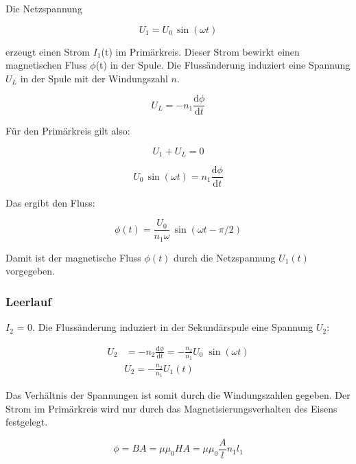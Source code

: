 \documentclass[11pt,ngerman]{scrartcl}
\newcommand{\der}[2]{\frac{\mathrm{d}#1}{\mathrm{d}#2}}
\begin{document}
Die Netzspannung

\begin{equation}
	U_1 = U_0 \, \sin{(\omega t)}
\end{equation}

erzeugt einen Strom $I_1$(t) im Primärkreis. Dieser Strom bewirkt einen magnetischen Fluss $\phi$(t)
in der Spule. Die Flussänderung induziert eine Spannung $U_L$ in der Spule mit der Windungszahl
$n$.

\begin{equation}
	U_L = -n_1 \der{\phi}{t}
\end{equation}

Für den Primärkreis gilt also:

\begin{equation}
	U_1 + U_L = 0
\end{equation}

\begin{equation}
	U_0 \, \sin{(\omega t)} = n_1 \der{\phi}{t}
	\label{eq:aleksey}
\end{equation}

Das ergibt den Fluss:

\begin{equation}
	\phi (t) = \frac{U_0}{n_1 \omega} \, \sin(\omega t - \pi / 2)
\end{equation}

Damit ist der magnetische Fluss $\phi(t)$ durch die Netzspannung $U_1(t)$ vorgegeben.

\newpage

\subsubsection{Leerlauf}

$I_2$ = 0. Die Flussänderung induziert in der Sekundärspule eine Spannung $U_2$:

\begin{align*}
	U_2 & = - n_2 \der{\phi}{t} = -\frac{n_2}{n_1} U_0 \; \sin{(\omega t)}
\end{align*}
\begin{align}
	U_2 = -\frac{n_2}{n_1} U_1(t) \qquad \qquad
\end{align}

Das Verhältnis der Spannungen ist somit durch die Windungszahlen gegeben. Der Strom im
Primärkreis wird nur durch das Magnetisierungsverhalten des Eisens festgelegt.

\begin{equation}
	\phi = B A = \mu \mu_0 H A = \mu \mu_0 \frac{A}{l} n_1 l_1
\end{equation}
\end{document}
